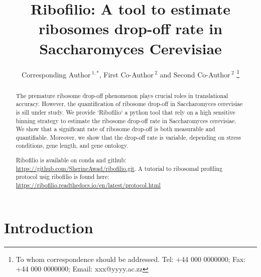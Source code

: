 \documentclass[a4,center,fleqn]{NAR}
\begin{document}
\title{Ribofilio: A tool to estimate ribosomes drop-off rate in Saccharomyces Cerevisiae}

\author{%
Corresponding Author\,$^{1,*}$,
First Co-Author\,$^{2}$
and Second Co-Author\,$^2$%
\footnote{To whom correspondence should be addressed.
Tel: +44 000 0000000; Fax: +44 000 0000000; Email: xxx@yyyy.ac.zz}}

\address{%
$^{1}$Affiliation of Corresponding Author
and
$^{2}$Affiliation of Both Co-Authors}


\maketitle

\begin{abstract}
The premature ribosome drop-off phenomenon plays crucial roles in translational accuracy. However, the quantification of ribosome drop-off in Saccharomyces cerevisiae is sill under study.  
We provide `Ribofilio` a python tool that rely on a high sensitive binning strategy to estimate the ribosome drop-off rate in Saccharomyces cerevisiae. We show that a significant rate of ribosome drop-off is both measurable and quantifiable. Moreover, we show that the drop-off rate is variable, depending on stress conditions, gene length, and  gene ontology.  

Ribofilio is available on conda and github: 
\href{url}{https://github.com/SherineAwad/ribofilio.git}. A tutorial to ribosomal profiling protocol usig ribofilio is found here: \href{url}{https://ribofilio.readthedocs.io/en/latest/protocol.html}
\end{abstract}


\section{Introduction}
\end{document}

